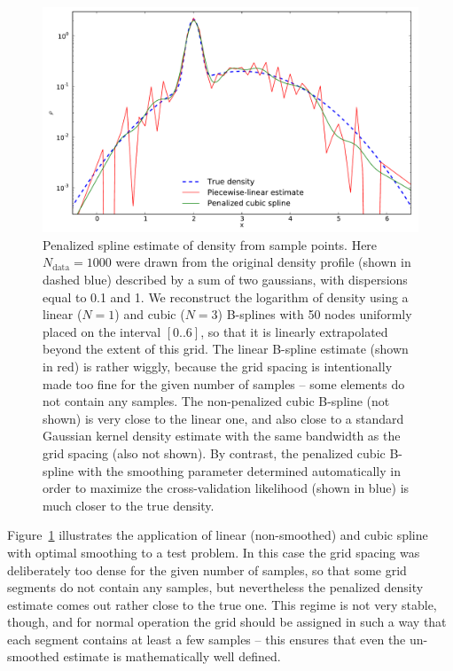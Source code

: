 \documentclass[12pt]{article}
\begin{document}
\begin{figure}
\begin{center}
\includegraphics[width=12cm]{SplineLogDensity.pdf}
\end{center}
\caption{Penalized spline estimate of density from sample points. Here $N_\mathrm{data}=1000$ were drawn from the original density profile (shown in dashed blue) described by a sum of two gaussians, with dispersions equal to 0.1 and 1. We reconstruct the logarithm of density using a linear ($N=1$) and cubic ($N=3$) B-splines with 50 nodes uniformly placed on the interval $[0..6]$, so that it is linearly extrapolated beyond the extent of this grid. The linear B-spline estimate (shown in red) is rather wiggly, because the grid spacing is intentionally made too fine for the given number of samples -- some elements do not contain any samples. The non-penalized cubic B-spline (not shown) is very close to the linear one, and also close to a standard Gaussian kernel density estimate with the same bandwidth as the grid spacing (also not shown). By contrast, the penalized cubic B-spline with the smoothing parameter determined automatically in order to maximize the cross-validation likelihood (shown in blue) is much closer to the true density.
} \label{fig:SplineLogDensity}
\end{figure}

Figure~\ref{fig:SplineLogDensity} illustrates the application of linear (non-smoothed) and cubic spline with optimal smoothing to a test problem. In this case the grid spacing was deliberately too dense for the given number of samples, so that some grid segments do not contain any samples, but nevertheless the penalized density estimate comes out rather close to the true one.
This regime is not very stable, though, and for normal operation the grid should be assigned in such a way that each segment contains at least a few samples -- this ensures that even the un-smoothed estimate is mathematically well defined.
\end{document}
